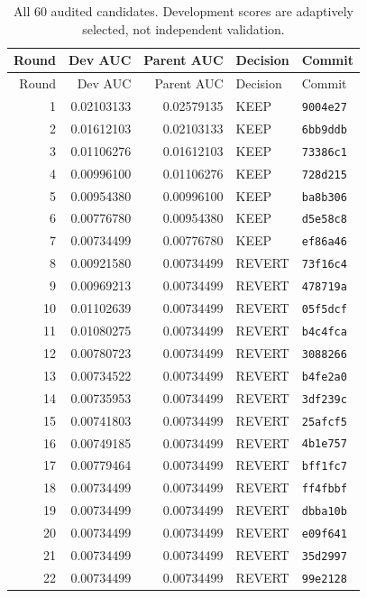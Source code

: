\begin{longtable}{rrrll}
\caption{All 60 audited candidates. Development scores are adaptively selected, not independent validation.}\label{tab:alltrials}\\
\toprule Round & Dev AUC & Parent AUC & Decision & Commit \\ \midrule\endfirsthead
\toprule Round & Dev AUC & Parent AUC & Decision & Commit \\ \midrule\endhead
1 & 0.02103133 & 0.02579135 & KEEP & \texttt{9004e27} \\
2 & 0.01612103 & 0.02103133 & KEEP & \texttt{6bb9ddb} \\
3 & 0.01106276 & 0.01612103 & KEEP & \texttt{73386c1} \\
4 & 0.00996100 & 0.01106276 & KEEP & \texttt{728d215} \\
5 & 0.00954380 & 0.00996100 & KEEP & \texttt{ba8b306} \\
6 & 0.00776780 & 0.00954380 & KEEP & \texttt{d5e58c8} \\
7 & 0.00734499 & 0.00776780 & KEEP & \texttt{ef86a46} \\
8 & 0.00921580 & 0.00734499 & REVERT & \texttt{73f16c4} \\
9 & 0.00969213 & 0.00734499 & REVERT & \texttt{478719a} \\
10 & 0.01102639 & 0.00734499 & REVERT & \texttt{05f5dcf} \\
11 & 0.01080275 & 0.00734499 & REVERT & \texttt{b4c4fca} \\
12 & 0.00780723 & 0.00734499 & REVERT & \texttt{3088266} \\
13 & 0.00734522 & 0.00734499 & REVERT & \texttt{b4fe2a0} \\
14 & 0.00735953 & 0.00734499 & REVERT & \texttt{3df239c} \\
15 & 0.00741803 & 0.00734499 & REVERT & \texttt{25afcf5} \\
16 & 0.00749185 & 0.00734499 & REVERT & \texttt{4b1e757} \\
17 & 0.00779464 & 0.00734499 & REVERT & \texttt{bff1fc7} \\
18 & 0.00734499 & 0.00734499 & REVERT & \texttt{ff4fbbf} \\
19 & 0.00734499 & 0.00734499 & REVERT & \texttt{dbba10b} \\
20 & 0.00734499 & 0.00734499 & REVERT & \texttt{e09f641} \\
21 & 0.00734499 & 0.00734499 & REVERT & \texttt{35d2997} \\
22 & 0.00734499 & 0.00734499 & REVERT & \texttt{99e2128} \\

\end{longtable}
